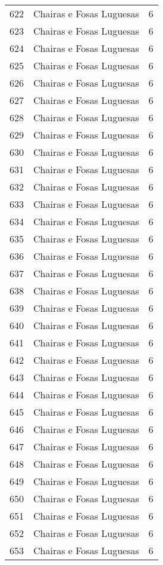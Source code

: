 \begin{table}[p]
\begin{tabular}{rlr}
  622 & Chairas e Fosas Luguesas &   6 \\ 
  623 & Chairas e Fosas Luguesas &   6 \\ 
  624 & Chairas e Fosas Luguesas &   6 \\ 
  625 & Chairas e Fosas Luguesas &   6 \\ 
  626 & Chairas e Fosas Luguesas &   6 \\ 
  627 & Chairas e Fosas Luguesas &   6 \\ 
  628 & Chairas e Fosas Luguesas &   6 \\ 
  629 & Chairas e Fosas Luguesas &   6 \\ 
  630 & Chairas e Fosas Luguesas &   6 \\ 
  631 & Chairas e Fosas Luguesas &   6 \\ 
  632 & Chairas e Fosas Luguesas &   6 \\ 
  633 & Chairas e Fosas Luguesas &   6 \\ 
  634 & Chairas e Fosas Luguesas &   6 \\ 
  635 & Chairas e Fosas Luguesas &   6 \\ 
  636 & Chairas e Fosas Luguesas &   6 \\ 
  637 & Chairas e Fosas Luguesas &   6 \\ 
  638 & Chairas e Fosas Luguesas &   6 \\ 
  639 & Chairas e Fosas Luguesas &   6 \\ 
  640 & Chairas e Fosas Luguesas &   6 \\ 
  641 & Chairas e Fosas Luguesas &   6 \\ 
  642 & Chairas e Fosas Luguesas &   6 \\ 
  643 & Chairas e Fosas Luguesas &   6 \\ 
  644 & Chairas e Fosas Luguesas &   6 \\ 
  645 & Chairas e Fosas Luguesas &   6 \\ 
  646 & Chairas e Fosas Luguesas &   6 \\ 
  647 & Chairas e Fosas Luguesas &   6 \\ 
  648 & Chairas e Fosas Luguesas &   6 \\ 
  649 & Chairas e Fosas Luguesas &   6 \\ 
  650 & Chairas e Fosas Luguesas &   6 \\ 
  651 & Chairas e Fosas Luguesas &   6 \\ 
  652 & Chairas e Fosas Luguesas &   6 \\ 
  653 & Chairas e Fosas Luguesas &   6 \\ 

\end{tabular}
\end{table}
